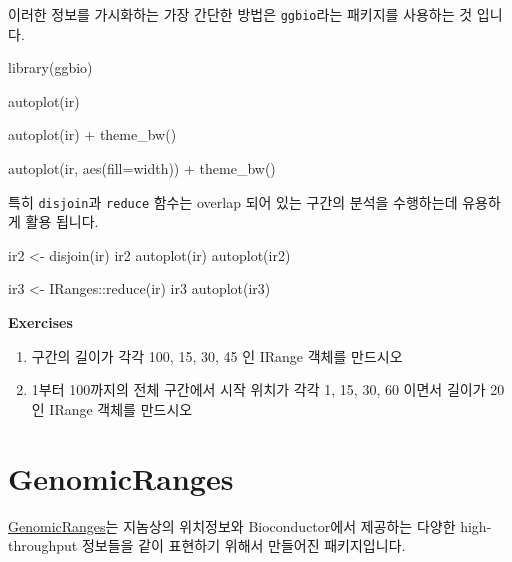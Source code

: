 \documentclass[
]{book}
\newenvironment{Shaded}{\begin{snugshade}}{\end{snugshade}}
\newcommand{\AttributeTok}[1]{\textcolor[rgb]{0.77,0.63,0.00}{#1}}
\newcommand{\FunctionTok}[1]{\textcolor[rgb]{0.00,0.00,0.00}{#1}}
\newcommand{\NormalTok}[1]{#1}
\newcommand{\OtherTok}[1]{\textcolor[rgb]{0.56,0.35,0.01}{#1}}
\newcommand{\SpecialCharTok}[1]{\textcolor[rgb]{0.00,0.00,0.00}{#1}}
\begin{document}
이러한 정보를 가시화하는 가장 간단한 방법은 \texttt{ggbio}라는 패키지를 사용하는 것 입니다.

\begin{Shaded}
\begin{Highlighting}[]
\FunctionTok{library}\NormalTok{(ggbio)}

\FunctionTok{autoplot}\NormalTok{(ir) }

\FunctionTok{autoplot}\NormalTok{(ir) }\SpecialCharTok{+} 
  \FunctionTok{theme\_bw}\NormalTok{()}

\FunctionTok{autoplot}\NormalTok{(ir, }\FunctionTok{aes}\NormalTok{(}\AttributeTok{fill=}\NormalTok{width)) }\SpecialCharTok{+}
  \FunctionTok{theme\_bw}\NormalTok{()}
\end{Highlighting}
\end{Shaded}

특히 \texttt{disjoin}과 \texttt{reduce} 함수는 overlap 되어 있는 구간의 분석을 수행하는데 유용하게 활용 됩니다.

\begin{Shaded}
\begin{Highlighting}[]
\NormalTok{ir2 }\OtherTok{\textless{}{-}} \FunctionTok{disjoin}\NormalTok{(ir)}
\NormalTok{ir2}
\FunctionTok{autoplot}\NormalTok{(ir)}
\FunctionTok{autoplot}\NormalTok{(ir2) }

\NormalTok{ir3 }\OtherTok{\textless{}{-}}\NormalTok{ IRanges}\SpecialCharTok{::}\FunctionTok{reduce}\NormalTok{(ir)}
\NormalTok{ir3}
\FunctionTok{autoplot}\NormalTok{(ir3) }
\end{Highlighting}
\end{Shaded}

\textbf{Exercises }

\begin{enumerate}
\def\labelenumi{\arabic{enumi})}
\item
  구간의 길이가 각각 100, 15, 30, 45 인 IRange 객체를 만드시오
\item
  1부터 100까지의 전체 구간에서 시작 위치가 각각 1, 15, 30, 60 이면서 길이가 20 인 IRange 객체를 만드시오
\end{enumerate}

\hypertarget{genomicranges}{%
\section{GenomicRanges}\label{genomicranges}}

\href{https://bioconductor.org/packages/release/bioc/html/GenomicRanges.html}{GenomicRanges}는 지놈상의 위치정보와 Bioconductor에서 제공하는 다양한 high-throughput 정보들을 같이 표현하기 위해서 만들어진 패키지입니다.
\end{document}
